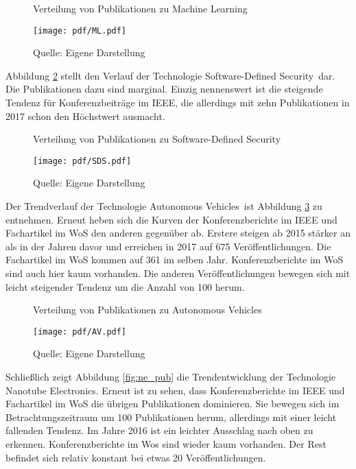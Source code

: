 \begin{figure}
	\centering
	\caption{Verteilung von Publikationen zu \glqq Machine Learning\grqq}
	\texttt{[image: pdf/ML.pdf]}
	\caption*{Quelle: Eigene Darstellung}
	\label{fig:ml_pub}
\end{figure}

Abbildung \ref{fig:sds_pub} stellt den Verlauf der Technologie \glqq Software-Defined Security\grqq~dar. Die Publikationen dazu sind marginal. Einzig nennenswert ist die steigende Tendenz für Konferenzbeiträge im \ac{IEEE}, die allerdings mit zehn Publikationen in 2017 schon den Höchstwert ausmacht.

\begin{figure}
	\centering
	\caption{Verteilung von Publikationen zu \glqq Software-Defined Security\grqq}
	\texttt{[image: pdf/SDS.pdf]}
	\caption*{Quelle: Eigene Darstellung}
	\label{fig:sds_pub}
\end{figure}

Der Trendverlauf der Technologie \glqq Autonomous Vehicles\grqq~ist Abbildung \ref{fig:av_pub} zu entnehmen. Erneut heben sich die Kurven der Konferenzberichte im \ac{IEEE} und Fachartikel im \ac{WoS} den anderen gegenüber ab. Erstere steigen ab 2015 stärker an als in der Jahren davor und erreichen in 2017 auf 675 Veröffentlichungen. Die Fachartikel im \ac{WoS} kommen auf 361 im selben Jahr. Konferenzberichte im \ac{WoS} sind auch hier kaum vorhanden. Die anderen Veröffentlichungen bewegen sich mit leicht steigender Tendenz um die Anzahl von 100 herum.

\begin{figure}
	\centering
	\caption{Verteilung von Publikationen zu \glqq Autonomous Vehicles\grqq}
	\texttt{[image: pdf/AV.pdf]}
	\caption*{Quelle: Eigene Darstellung}
	\label{fig:av_pub}
\end{figure}

Schließlich zeigt Abbildung \ref{fig:ne_pub} die Trendentwicklung der Technologie \glqq Nanotube Electronics\grqq. Erneut ist zu sehen, dass Konferenzberichte im \ac{IEEE} und Fachartikel im \ac{WoS} die übrigen Publikationen dominieren. Sie bewegen sich im Betrachtungszeitraum um 100 Publikationen herum, allerdings mit einer leicht fallenden Tendenz. Im Jahre 2016 ist ein leichter Ausschlag nach oben zu erkennen. Konferenzberichte im \ac{Wos} sind wieder kaum vorhanden. Der Rest befindet sich relativ konstant bei etwas 20 Veröffentlichungen.

